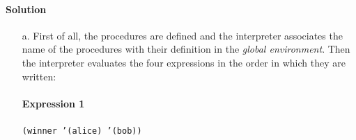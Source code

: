 \paragraph{Solution}
\begin{itemize}
    \item[a.] First of all, the procedures are defined and the interpreter associates the name of the procedures with their definition
        in the \textit{global environment}.
        Then the interpreter evaluates the four expressions in the order in which they are written: 
        
        \paragraph*{Expression 1} \texttt{(winner '(alice) '(bob))} 
        

\end{itemize}
